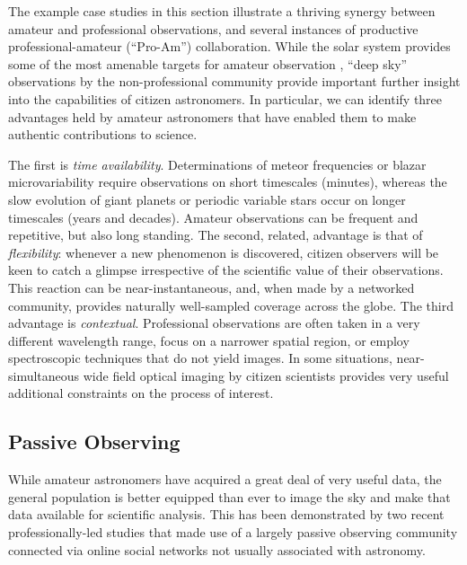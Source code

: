 \documentclass{ar2e}
\begin{document}
\vspace{\baselineskip}

The example case studies in this section illustrate a thriving synergy between
amateur and professional observations, and several instances of productive
professional-amateur (``Pro-Am'') collaboration. While the solar system provides
some of the most amenable targets for amateur observation
\citep{14mousis_proam}, ``deep sky'' observations by the non-professional
community provide important further insight into the capabilities  of citizen
astronomers. In particular, we can identify three advantages held by amateur
astronomers that have enabled them to make authentic contributions to science.

The first is \textit{time availability}. Determinations of meteor frequencies or
blazar microvariability require observations on short timescales (minutes),
whereas the slow evolution of giant planets or periodic variable stars occur on
longer timescales (years and decades).  Amateur observations can be  frequent
and repetitive, but also long standing.  The second, related, advantage is that
of \textit{flexibility}: whenever a new phenomenon is discovered, citizen
observers will be keen to catch a glimpse irrespective of the scientific value
of their observations.  This reaction can be near-instantaneous, and, when made
by a networked community, provides naturally well-sampled coverage across the
globe. The third advantage is \textit{contextual}.  Professional observations
are often taken in a very different wavelength range, focus on a narrower
spatial region, or employ spectroscopic techniques that do not yield images. In
some situations, near-simultaneous wide field optical imaging by citizen
scientists provides very useful additional constraints on the process of
interest.



\subsection{Passive Observing}
\label{sec:obs:passive}

While amateur astronomers have acquired a great deal of very useful data, the
general population is better equipped than ever to image the sky and make that
data available for scientific analysis. This has been demonstrated by two
recent professionally-led studies that made use of a largely passive
observing community connected via online social networks not usually
associated with astronomy. 
\end{document}
